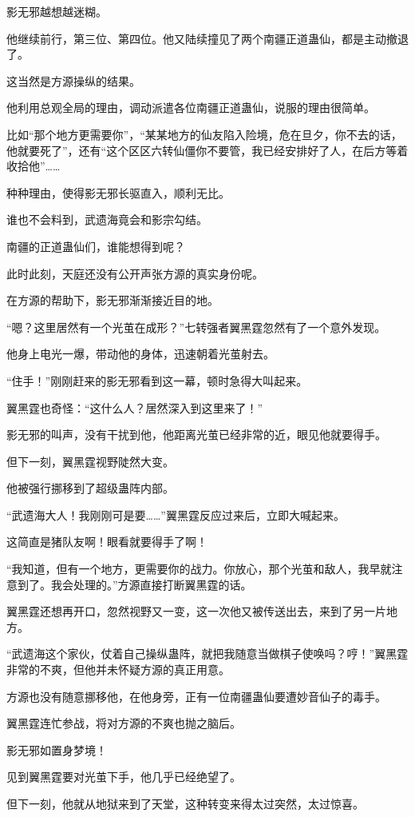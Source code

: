 \begin{this_body}
影无邪越想越迷糊。

他继续前行，第三位、第四位。他又陆续撞见了两个南疆正道蛊仙，都是主动撤退了。

这当然是方源操纵的结果。

他利用总观全局的理由，调动派遣各位南疆正道蛊仙，说服的理由很简单。

比如“那个地方更需要你”，“某某地方的仙友陷入险境，危在旦夕，你不去的话，他就要死了”，还有“这个区区六转仙僵你不要管，我已经安排好了人，在后方等着收拾他”……

种种理由，使得影无邪长驱直入，顺利无比。

谁也不会料到，武遗海竟会和影宗勾结。

南疆的正道蛊仙们，谁能想得到呢？

此时此刻，天庭还没有公开声张方源的真实身份呢。

在方源的帮助下，影无邪渐渐接近目的地。

“嗯？这里居然有一个光茧在成形？”七转强者翼黑霆忽然有了一个意外发现。

他身上电光一爆，带动他的身体，迅速朝着光茧射去。

“住手！”刚刚赶来的影无邪看到这一幕，顿时急得大叫起来。

翼黑霆也奇怪：“这什么人？居然深入到这里来了！”

影无邪的叫声，没有干扰到他，他距离光茧已经非常的近，眼见他就要得手。

但下一刻，翼黑霆视野陡然大变。

他被强行挪移到了超级蛊阵内部。

“武遗海大人！我刚刚可是要……”翼黑霆反应过来后，立即大喊起来。

这简直是猪队友啊！眼看就要得手了啊！

“我知道，但有一个地方，更需要你的战力。你放心，那个光茧和敌人，我早就注意到了。我会处理的。”方源直接打断翼黑霆的话。

翼黑霆还想再开口，忽然视野又一变，这一次他又被传送出去，来到了另一片地方。

“武遗海这个家伙，仗着自己操纵蛊阵，就把我随意当做棋子使唤吗？哼！”翼黑霆非常的不爽，但他并未怀疑方源的真正用意。

方源也没有随意挪移他，在他身旁，正有一位南疆蛊仙要遭妙音仙子的毒手。

翼黑霆连忙参战，将对方源的不爽也抛之脑后。

影无邪如置身梦境！

见到翼黑霆要对光茧下手，他几乎已经绝望了。

但下一刻，他就从地狱来到了天堂，这种转变来得太过突然，太过惊喜。


\end{this_body}
